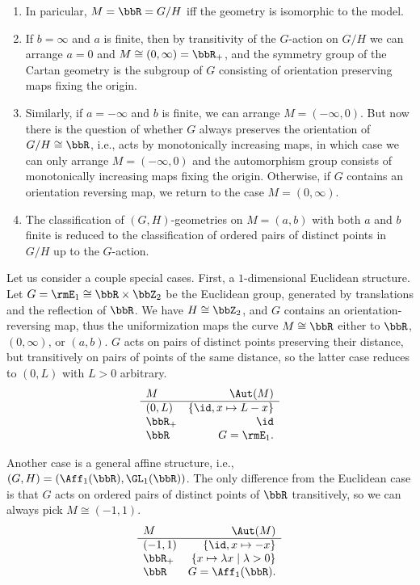 \begin{example}
    \begin{enumerate}
        \item In paricular, $M=\bbR=G\slash H$ iff the geometry is isomorphic to the model. 
        \item If $b=\infty$ and $a$ is finite, then by transitivity of the $G$-action on $G\slash H$ we can arrange $a=0$ and $M\cong (0,\infty)=\bbR_+$, and the symmetry group of the Cartan geometry is the subgroup of $G$ consisting of orientation preserving maps fixing the origin.
        \item Similarly, if $a=-\infty$ and $b$ is finite, we can arrange $M=(-\infty,0)$. But now there is the question of whether $G$ always preserves the orientation of $G\slash H\cong\bbR$, i.e., acts by monotonically increasing maps, in which case we can only arrange $M=(-\infty,0)$ and the automorphism group consists of monotonically increasing maps fixing the origin. Otherwise, if $G$ contains an orientation reversing map, we return to the case $M=(0,\infty)$.
        \item The classification of $(G,H)$-geometries on $M=(a,b)$ with both $a$ and $b$ finite is reduced to the classification of ordered pairs of distinct points in $G\slash H$ up to the $G$-action.
    \end{enumerate} 

    Let us consider a couple special cases. First, a $1$-dimensional Euclidean structure. Let $G=\rmE_1\cong \bbR\times\bbZ_2$ be the Euclidean group, generated by translations and the reflection of $\bbR$. We have $H\cong \bbZ_2$, and $G$ contains an orientation-reversing map, thus the uniformization maps the curve $M\cong\bbR$ either to $\bbR$, $(0,\infty)$, or $(a,b)$. $G$ acts on pairs of distinct points preserving their distance, but transitively on pairs of points of the same distance, so the latter case reduces to $(0,L)$ with $L>0$ arbitrary. 
    \[
    \begin{array}{lr}
        M & \Aut(M)  \\\hline
        (0,L) & \{\id,x\mapsto L-x\}\\
        \bbR_+ & \id\\
        \bbR & G=\rmE_1.
    \end{array}
    \]

    Another case is a general affine structure, i.e., $(G,H)=(\Aff_1(\bbR),\GL_1(\bbR))$. The only difference from the Euclidean case is that $G$ acts on ordered pairs of distinct points of $\bbR$ transitively, so we can always pick $M\cong (-1,1)$.
    \[\begin{array}{lr}
        M & \Aut(M)  \\\hline
        (-1,1) & \{\id,x\mapsto -x\}\\
        \bbR_+ & \{x\mapsto \lambda x\mid \lambda>0\}\\
        \bbR & G=\Aff_1(\bbR).
    \end{array}\]
\end{example}

